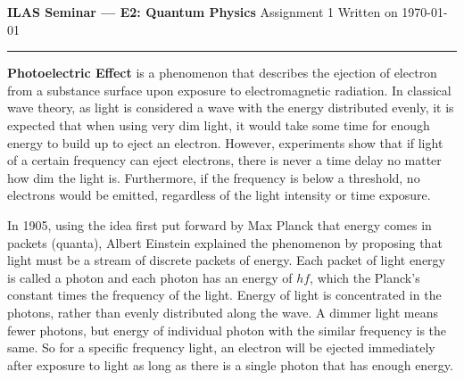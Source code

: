 



\noindent  
\large \textbf{ILAS Seminar — E2: Quantum Physics} \smallskip \newline
Assignment 1 \bigskip \newline
\small Written on \today \medskip
\hrule
\textbf{Photoelectric Effect} is a phenomenon that describes the ejection of electron  from a substance surface upon exposure to electromagnetic radiation. In classical wave theory, as light is considered a wave with the energy distributed evenly, it is expected that when using very dim light, it would take some time for enough energy to build up to eject an electron. However, experiments show that if light of a certain frequency can eject electrons, there is never a time delay no matter how dim the light is. Furthermore, if the frequency is below a threshold, no electrons would be emitted, regardless of the light intensity or time exposure. 

In 1905, using the idea first put forward by Max Planck that energy comes in packets (quanta), Albert Einstein explained the phenomenon by proposing that light must be a stream of discrete packets of energy. Each packet of light energy is called a photon and each photon has an energy of $hf$, which the Planck's constant times the frequency of the light. Energy of light is concentrated in the photons, rather than evenly distributed along the wave. A dimmer light means fewer photons, but energy of individual photon with the similar frequency is the same. So for a specific frequency light, an electron will be ejected immediately after exposure to light as long as there is a single photon that has enough energy.
